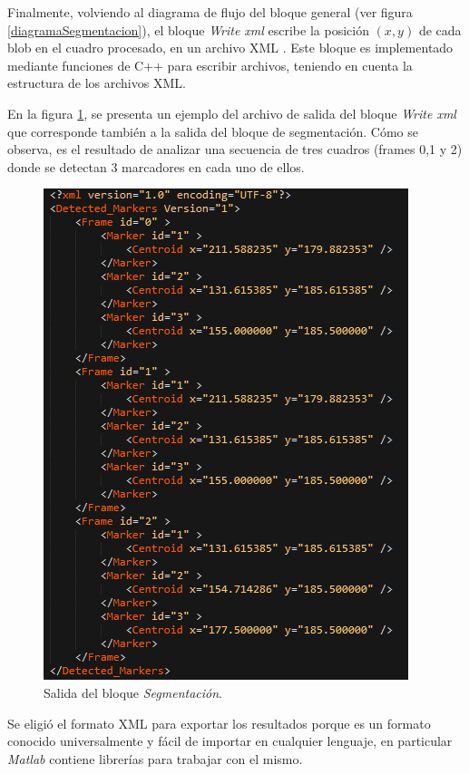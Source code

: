 Finalmente, volviendo al diagrama de flujo del bloque general (ver figura \ref{diagramaSegmentacion}), el bloque \emph{Write xml} escribe la posición $(x,y)$ de cada blob en el cuadro procesado, en un archivo XML \cite{xml}. Este bloque es implementado mediante funciones de C++ para escribir archivos, teniendo en cuenta la estructura de los archivos XML.

En la figura \ref{salidaxml}, se presenta un ejemplo del archivo de salida del bloque \emph{Write xml} que corresponde también a la salida del bloque de segmentación. Cómo se observa, es el resultado de analizar una secuencia de tres cuadros (frames 0,1 y 2) donde se detectan 3 marcadores en cada uno de ellos.

\begin{figure}[ht!]
\begin{center}
\includegraphics[scale=0.9]{img/salidaXml.png}
\end{center}
\caption{Salida del bloque \emph{Segmentación}.}
\label{salidaxml}
\end{figure}


 Se eligió el formato XML para exportar los resultados porque es un formato conocido universalmente y fácil de importar en cualquier lenguaje, en particular \emph{Matlab} contiene librerías para trabajar con el mismo.

